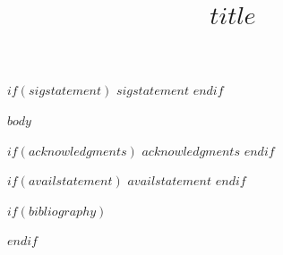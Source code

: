 \documentclass{ametsocV6.2}
\title{$title$}
\affiliation{
$for(by-affiliation)$
\aff{$by-affiliation.number$}{$by-affiliation.name$}$sep$\\ 
$endfor$
}
\begin{document}
\maketitle

%
%
%
$if(sigstatement)$
\sigstatement
$sigstatement$
$endif$


%
$body$

$if(acknowledgments)$
\acknowledgments
$acknowledgments$
$endif$

% 
%
$if(availstatement)$
\availstatement
$availstatement$
$endif$



\clearpage


$if(bibliography)$

$endif$
\end{document}
